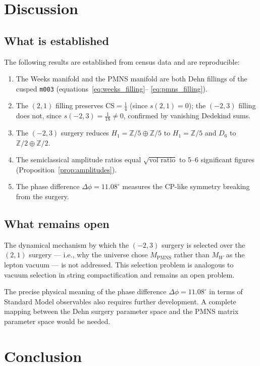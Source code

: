\documentclass[12pt]{article}
\theoremstyle{definition}
\begin{document}
\section{Discussion}
\label{sec:discussion}

\subsection{What is established}

The following results are established from census data and are
reproducible:
\begin{enumerate}
  \item The Weeks manifold and the PMNS manifold are both Dehn fillings
    of the cusped \texttt{m003} (equations~\eqref{eq:weeks_filling}--
    \eqref{eq:pmns_filling}).
  \item The $(2,1)$ filling preserves $\mathrm{CS} = \tfrac{1}{4}$ (since $s(2,1)=0$); the $(-2,3)$ filling does not, since $s(-2,3)=\tfrac{1}{18}\neq 0$,
    confirmed by vanishing Dedekind sums.
  \item The $(-2,3)$ surgery reduces $H_1 = \mathbb{Z}/5\oplus
    \mathbb{Z}/5$ to $H_1 = \mathbb{Z}/5$ and $D_6$ to
    $\mathbb{Z}/2\oplus\mathbb{Z}/2$.
  \item The semiclassical amplitude ratios equal $\sqrt{\text{vol ratio}}$
    to 5--6 significant figures (Proposition~\ref{prop:amplitudes}).
  \item The phase difference $\Delta\phi = 11.08^\circ$ measures
    the CP-like symmetry breaking from the surgery.
\end{enumerate}

\subsection{What remains open}

The dynamical mechanism by which the $(-2,3)$ surgery is selected over
the $(2,1)$ surgery --- i.e., why the universe chose $M_\mathrm{PMNS}$
rather than $M_W$ as the lepton vacuum --- is not addressed. This
selection problem is analogous to vacuum selection in string
compactification and remains an open problem.

The precise physical meaning of the phase difference $\Delta\phi =
11.08^\circ$ in terms of Standard Model observables also requires
further development. A complete mapping between the Dehn surgery
parameter space and the PMNS matrix parameter space would be needed.

\section{Conclusion}
\label{sec:conclusion}
\end{document}
